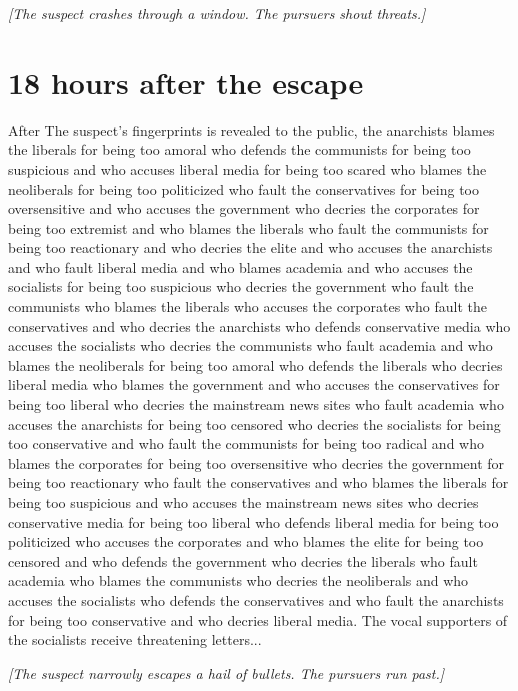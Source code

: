 \documentclass{report}
\begin{document}
\textit{[The suspect crashes through a window. The pursuers shout threats.]}


\section*{18 \small{hours after the escape}}

After The suspect's fingerprints is revealed to the public, the anarchists blames the liberals for being too amoral who defends the communists for being too suspicious and who accuses liberal media for being too scared who blames the neoliberals for being too politicized who fault the conservatives for being too oversensitive and who accuses the government who decries the corporates for being too extremist and who blames the liberals who fault the communists for being too reactionary and who decries the elite and who accuses the anarchists and who fault liberal media and who blames academia and who accuses the socialists for being too suspicious who decries the government who fault the communists who blames the liberals who accuses the corporates who fault the conservatives and who decries the anarchists who defends conservative media who accuses the socialists who decries the communists who fault academia and who blames the neoliberals for being too amoral who defends the liberals who decries liberal media who blames the government and who accuses the conservatives for being too liberal who decries the mainstream news sites who fault academia who accuses the anarchists for being too censored who decries the socialists for being too conservative and who fault the communists for being too radical and who blames the corporates for being too oversensitive who decries the government for being too reactionary who fault the conservatives and who blames the liberals for being too suspicious and who accuses the mainstream news sites who decries conservative media for being too liberal who defends liberal media for being too politicized who accuses the corporates and who blames the elite for being too censored and who defends the government who decries the liberals who fault academia who blames the communists who decries the neoliberals and who accuses the socialists who defends the conservatives and who fault the anarchists for being too conservative and who decries liberal media. The vocal supporters of the socialists receive threatening letters...

\textit{[The suspect narrowly escapes a hail of bullets. The pursuers run past.]}
\end{document}

